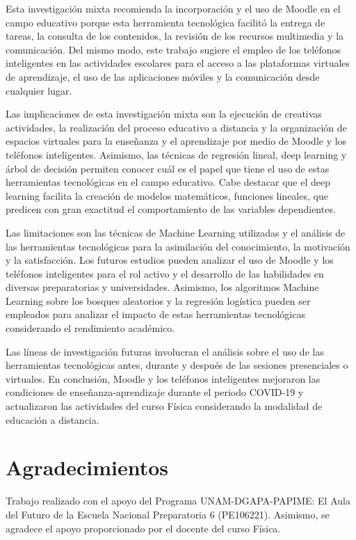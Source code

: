 \documentclass[spanish]{textolivre}
\begin{document}
Esta investigación mixta recomienda la incorporación y el uso de Moodle en el campo educativo porque esta herramienta tecnológica facilitó la entrega de tareas, la consulta de los contenidos, la revisión de los recursos multimedia y la comunicación. Del mismo modo, este trabajo sugiere el empleo de los teléfonos inteligentes en las actividades escolares para el acceso a las plataformas virtuales de aprendizaje, el uso de las aplicaciones móviles y la comunicación desde cualquier lugar.

Las implicaciones de esta investigación mixta son la ejecución de creativas actividades, la realización del proceso educativo a distancia y la organización de espacios virtuales para la enseñanza y el aprendizaje por medio de Moodle y los teléfonos inteligentes. Asimismo, las técnicas de regresión lineal, deep learning y árbol de decisión permiten conocer cuál es el papel que tiene el uso de estas herramientas tecnológicas en el campo educativo. Cabe destacar que el deep learning facilita la creación de modelos matemáticos, funciones lineales, que predicen con gran exactitud el comportamiento de las variables dependientes.

Las limitaciones son las técnicas de Machine Learning utilizadas y el análisis de las herramientas tecnológicas para la asimilación del conocimiento, la motivación y la satisfacción. Los futuros estudios pueden analizar el uso de Moodle y los teléfonos inteligentes para el rol activo y el desarrollo de las habilidades en diversas preparatorias y universidades. Asimismo, los algoritmos Machine Learning sobre los bosques aleatorios y la regresión logística pueden ser empleados para analizar el impacto de estas herramientas tecnológicas considerando el rendimiento académico.

Las líneas de investigación futuras involucran el análisis sobre el uso de las herramientas tecnológicas antes, durante y después de las sesiones presenciales o virtuales. En conclusión, Moodle y los teléfonos inteligentes mejoraron las condiciones de enseñanza-aprendizaje durante el periodo COVID-19 y actualizaron las actividades del curso Física considerando la modalidad de educación a distancia.

\section{Agradecimientos}
Trabajo realizado con el apoyo del Programa UNAM-DGAPA-PAPIME: El Aula del Futuro de la Escuela Nacional Preparatoria 6 (PE106221). Asimismo, se agradece el apoyo proporcionado por el docente del curso Física.
\end{document}
